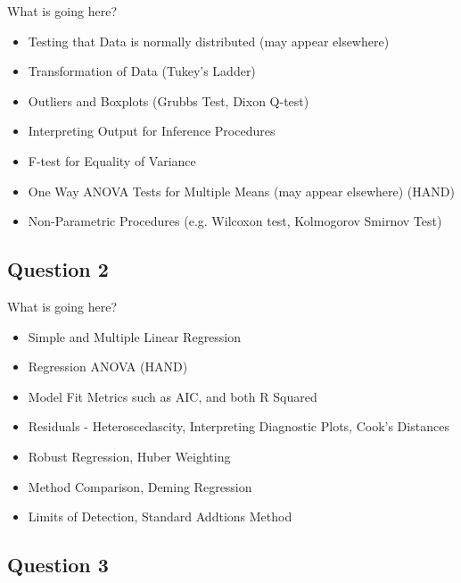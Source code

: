 \documentclass[a4paper,12pt]{article}
\begin{document}
\begin{framed}
What is going here?
\begin{itemize}
\item Testing that Data is normally distributed (may appear elsewhere)
\item Transformation of Data (Tukey's Ladder)
\item Outliers and Boxplots (Grubbs Test, Dixon Q-test)
		\item Interpreting Output for Inference Procedures
		\item F-test for Equality of Variance
		\item One Way ANOVA Tests for Multiple Means (may appear elsewhere) (HAND)
\item Non-Parametric Procedures (e.g. Wilcoxon test, Kolmogorov Smirnov Test)
\end{itemize}
\end{framed}



\newpage
\subsection*{Question 2}
\begin{framed}
	What is going here?
	\begin{itemize}
		\item Simple and Multiple Linear Regression
		\item Regression ANOVA (HAND)
		\item Model Fit Metrics such as AIC, and both R Squared
		\item Residuals - Heteroscedascity, Interpreting Diagnostic Plots,  Cook's Distances
		\item Robust Regression, Huber Weighting
		\item Method Comparison, Deming Regression
		\item Limits of Detection, Standard Addtions Method
	\end{itemize}
\end{framed}


\newpage
\subsection*{Question 3}
\end{document}
